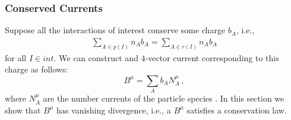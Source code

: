 \subsubsection{Conserved Currents}
Suppose all the interactions of interest conserve some charge $b_A$, i.e.,
 \begin{align}\label{eq:conserved_charge}
\sum_{A\in p(I)} n_Ab_A=\sum_{A\in r(I)} n_Ab_A
\end{align}
for all $I\in int$.   We can construct and $4$-vector current corresponding to this charge as follows:
\begin{equation}
B^\mu=\sum_A b_A N_A^\mu\,,
\end{equation}
where $N^\mu_A$ are the number currents of the particle species .  In this section we show that $B^\mu$ has vanishing divergence,  i.e., a $B^\mu$ satisfies a conservation law.

